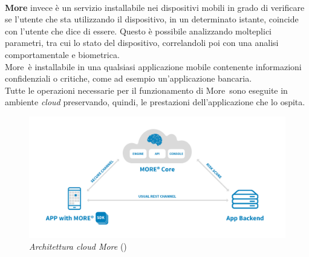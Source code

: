 \\
\textbf{More\textregistered} invece è un servizio installabile nei dispositivi mobili in grado di verificare se l'utente che sta utilizzando il dispositivo, in un determinato istante, coincide con l'utente che dice di essere. Questo è possibile analizzando molteplici parametri, tra cui lo stato del dispositivo, correlandoli poi con una analisi comportamentale e biometrica.\\
More\textregistered\ è installabile in una qualsiasi applicazione mobile contenente informazioni confidenziali o critiche, come ad esempio un'applicazione bancaria.\\
Tutte le operazioni necessarie per il funzionamento di More\textregistered\ sono eseguite in ambiente \textit{cloud} preservando, quindi, le prestazioni dell'applicazione che lo ospita.

\begin{figure}[h!]
	\centering
	\includegraphics[scale=0.15]{immagini/more-arc.png}
	\caption{\textit{Architettura cloud More\textregistered} ()}
\end{figure}
\newpage
